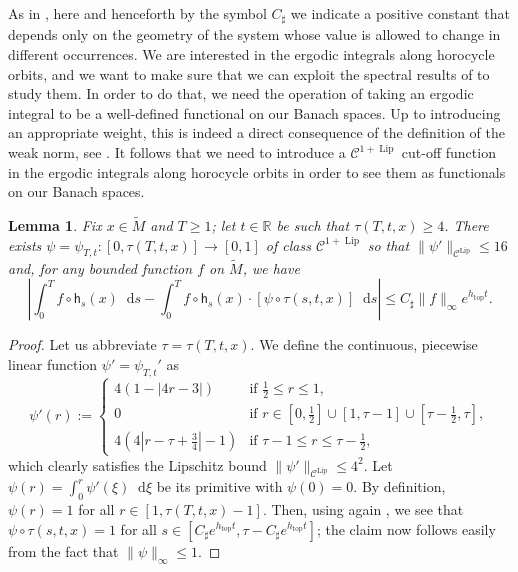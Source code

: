 \documentclass[11pt,letterpaper]{amsart}
\newcommand \R {{ \mathbb R}}
\newcommand \tM {{\widetilde M}}
\newcommand \sC {{C_\sharp}}
\newcommand{\horo}{\mathsf{h}}
\newcommand*{\diff}{\mathop{}\!\mathrm{d}}
\DeclareMathOperator{\topp}{top}
\DeclareMathOperator{\Lip}{Lip}
\newtheorem {lemma}[theorem]{Lemma}
\theoremstyle{definition}
\begin{document}
As in , here and henceforth by the symbol $\sC$ we indicate a positive constant that depends only on the geometry of the system whose value is allowed to change in different occurrences.
We are interested in the ergodic integrals along horocycle orbits, and we want to make sure that we can exploit the spectral results of  to study them. In order to do that, we need the operation of taking an ergodic integral to be a well-defined functional on our Banach spaces. Up to introducing an appropriate weight, this is indeed a direct consequence of the definition of the weak norm, see . It follows that we need to introduce a $\mathscr{C}^{1+\Lip}$ cut-off function in the ergodic integrals along horocycle orbits in order to see them as functionals on our Banach spaces. 
\begin{lemma}\label{lem:smoothened_erg_int}
\sloppy	Fix $x \in \tM$ and $T \geq 1$; let $t\in \R$ be such that $\tau(T,t,x) \geq 4$. There exists $\psi=\psi_{T,t} \colon [0,\tau(T,t,x)] \to [0,1]$ of class $\mathscr{C}^{1+\Lip}$ so that $\|\psi'\|_{\mathscr{C}^{\Lip}} \leq  16$ and, for any bounded function $f$ on $\tM$, we have
	\[
	\left\lvert \int_{0}^{T} f \circ \horo_s(x) \diff s - \int_{0}^{T} f \circ \horo_s(x) \cdot [\psi \circ \tau(s,t,x) ]\diff s \right\rvert \leq \sC \|f\|_{\infty} e^{h_{\topp}t}.
	\]
\end{lemma}
\begin{proof}
	Let us abbreviate $\tau = \tau(T,t,x)$. We define the continuous, piecewise linear function $\psi'=\psi_{T,t}'$ as 
\[
	\psi'(r):=
	\begin{cases}
		4\left(1-\left|4r-3\right|\right) & \text{if } \frac{1}{2} \leq r\leq 1,\\[1mm]
		0 & \text{if }r \in [0,\frac{1}{2}] \cup [1, \tau-1] \cup [\tau-\frac{1}{2},\tau],\\[1mm]
		4\left(4\left|r-\tau+\frac{3}{4}\right|-1\right) & \text{if } \tau-1 \leq r\leq \tau-\frac{1}{2},
	\end{cases}
	\]
which clearly satisfies the Lipschitz bound $\|\psi'\|_{\mathscr{C}^{\Lip}} \leq 4^2$. Let $\psi(r) = \int_0^r \psi'(\xi)\diff \xi$ be its primitive with $\psi(0) = 0$. By definition, $\psi(r) = 1$ for all $r \in [1, \tau(T,t,x)-1]$. Then, using again , we see that $\psi \circ \tau(s,t,x) =1$ for all $s \in [\sC e^{h_{\topp}t}, \tau - \sC e^{h_{\topp}t}]$; the claim now follows easily from the fact that $\|\psi\|_{\infty} \leq 1$.
\end{proof}
\end{document}
